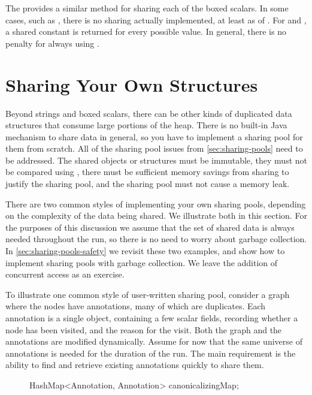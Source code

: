 The \jre provides a similar  method for sharing each of the boxed
scalars. In some cases, such as , there is no sharing actually implemented, at
least as of \javasix. For  and , a
shared constant is returned for every possible value. In
general, there is no penalty for always using .


\section{Sharing Your Own Structures}
\label{sec:canonicalizing-maps}

Beyond strings and boxed scalars, there can be other kinds of
duplicated data structures that consume large portions of the heap. 
There is no built-in Java mechanism to share data
in general, so you have to implement a sharing pool for them from
scratch. All of the sharing pool issues from \autoref{sec:sharing-pools} need
to be addressed. The shared objects or structures must be immutable, they must not be
compared using \code{==}, there must be sufficient memory savings from sharing
to justify the sharing pool, and the sharing pool must not cause a memory leak. 

There are two common styles of implementing your own sharing pools, depending on
the complexity of the data being shared.  We illustrate both in this section. 
For the purposes of this discussion we assume that the set of shared data is
always needed throughout the run, so there is no need to worry about garbage collection. In
\autoref{sec:sharing-pools-safety} we revisit these two examples, and show how
to implement sharing pools with garbage collection.  We leave the addition of
concurrent access as an exercise. 

To illustrate one common style of user-written sharing pool, consider a graph
where the nodes have annotations, many of which are duplicates. Each annotation is a single
object, containing a few scalar fields, recording whether a node has been
visited, and the reason for the visit.  Both the graph and the annotations are modified
dynamically. Assume for now that the same universe of annotations is needed for
the duration of the run. The main requirement is the ability to find and
retrieve existing annotations quickly to share them.

\begin{figure}
\centering
\begin{framedlisting}
HashMap<Annotation, Annotation> canonicalizingMap;
\end{framedlisting}
\end{figure}

